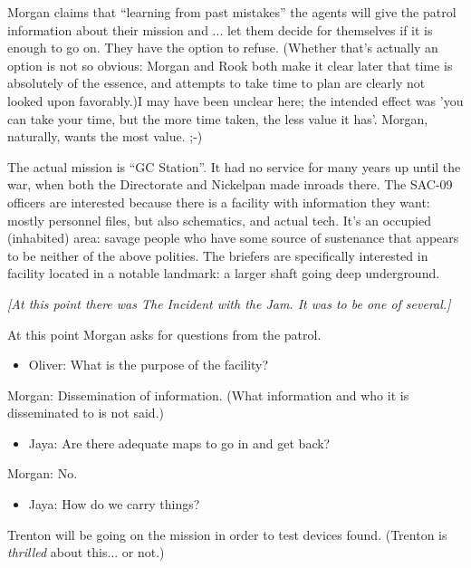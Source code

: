 Morgan claims that ``learning from past mistakes'' the agents will give the patrol information about their mission and ... let them decide for themselves if it is enough to go on.  They have the option to refuse.  (Whether that's actually an option is not so obvious: Morgan and Rook both make it clear later that time is absolutely of the essence, and attempts to take time to plan are clearly not looked upon favorably.)I may have been unclear here; the intended effect was 'you can take your time, but the more time taken, the less value it has'. Morgan, naturally, wants the most value. ;-)



The actual mission is ``GC Station''.  It had no service for many years up until the war, when both the Directorate and Nickelpan made inroads there.  The SAC-09 officers are interested because there is a facility with information they want: mostly personnel files, but also schematics, and actual tech.   It's an occupied (inhabited) area: savage people who have some source of sustenance that appears to be neither of the above polities.  The briefers are specifically interested in facility located in a notable landmark: a larger shaft going deep underground.



\textit{{[}At this point there was The Incident with the Jam.  It was to be one of several.{]}}



At this point Morgan asks for questions from the patrol.

\begin{itemize}
\item Oliver: What is the purpose of the facility?
\end{itemize}

Morgan: Dissemination of information.  (What information and who it is disseminated to is not said.)

\begin{itemize}
\item Jaya: Are there adequate maps to go in and get back?
\end{itemize}

Morgan: No.

\begin{itemize}
\item Jaya: How do we carry things?
\end{itemize}

Trenton will be going on the mission in order to test devices found.  (Trenton is\textit{ thrilled} about this... or not.)

